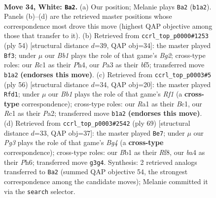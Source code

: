 \documentclass[11pt]{article}
\begin{document}
\clearpage

\begin{figure}[p]\centering
\begin{subfigure}{0.46\textwidth}\centering
\resizebox{\linewidth}{!}{%
\newchessgame
\chessboard[
  setfen={r7/pp3p2/5k2/7p/bP2P3/P5Pp/3r1P1K/RBR5 w - - 4 34},
  showmover=false,
  pgfstyle=straightmove, color=movearrow, markmove={b1-a2}
]}
\caption{}
\end{subfigure}\hfill
\begin{subfigure}{0.46\textwidth}\centering
\resizebox{\linewidth}{!}{%
\newchessgame
\chessboard[
  setfen={4r1k1/1R3pp1/8/3Ppb1p/7P/6P1/3r1PB1/R5K1 w - - 3 28},
  showmover=false,
  pgfstyle=straightmove, color=movearrow, markmove={g2-f3}
]}
\caption{}
\end{subfigure}
\\[4pt]
\begin{subfigure}{0.46\textwidth}\centering
\resizebox{\linewidth}{!}{%
\newchessgame
\chessboard[
  setfen={8/ppb2r1k/4r2p/2p5/4P2p/1P1R1P2/P5K1/2B2R2 w - - 4 29},
  showmover=false,
  pgfstyle=straightmove, color=movearrow, markmove={f1-d1}
]}
\caption{}
\end{subfigure}\hfill
\begin{subfigure}{0.46\textwidth}\centering
\resizebox{\linewidth}{!}{%
\newchessgame
\chessboard[
  setfen={5r1k/6p1/7p/p1r3b1/3RB1P1/5pP1/P1P4K/5R2 b - - 1 35},
  showmover=false,
  pgfstyle=straightmove, color=movearrow, markmove={g5-e7}
]}
\caption{}
\end{subfigure}
\caption{\textbf{Move 34, White: \texttt{Ba2}.} (a) Our position; Melanie plays \texttt{Ba2} (\texttt{b1a2}). Panels (b)--(d) are the retrieved master positions whose correspondence most drove this move (highest QAP objective among those that transfer to it). (b) Retrieved from \texttt{ccrl\_top\_p0000\#1253} (ply 54) [structural distance $d$=39, QAP obj=34]: the master played \texttt{Bf3}; under $\mu$ our \emph{Bb1} plays the role of that game's \emph{Bg2}; cross-type roles: our \emph{R}c1 as their \emph{P}h4, our \emph{P}a3 as their \emph{b}f5; transferred move \texttt{b1a2} \textbf{(endorses this move)}. (c) Retrieved from \texttt{ccrl\_top\_p0003\#5} (ply 56) [structural distance $d$=34, QAP obj=20]: the master played \texttt{Rfd1}; under $\mu$ our \emph{Bb1} plays the role of that game's \emph{Rf1} (a \textbf{cross-type} correspondence); cross-type roles: our \emph{R}a1 as their \emph{B}c1, our \emph{R}c1 as their \emph{P}a2; transferred move \texttt{b1a2} \textbf{(endorses this move)}. (d) Retrieved from \texttt{ccrl\_top\_p0003\#2542} (ply 69) [structural distance $d$=33, QAP obj=37]: the master played \texttt{Be7}; under $\mu$ our \emph{Pg3} plays the role of that game's \emph{Bg4} (a \textbf{cross-type} correspondence); cross-type roles: our \emph{B}b1 as their \emph{R}f8, our \emph{b}a4 as their \emph{P}h6; transferred move \texttt{g3g4}. Synthesis: 2 retrieved analogs transferred to \texttt{Ba2} (summed QAP objective 54, the strongest correspondence among the candidate moves); Melanie committed it via the \texttt{search} selector.}
\label{fig:thought-m66}
\end{figure}
\end{document}
